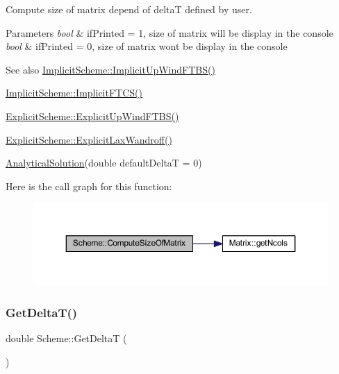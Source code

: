 Compute size of matrix depend of deltaT defined by user. 
\begin{DoxyParams}{Parameters}
{\em bool} & if\+Printed = 1, size of matrix will be display in the console \\
\hline
{\em bool} & if\+Printed = 0, size of matrix won\textquotesingle{}t be display in the console \\
\hline
\end{DoxyParams}
\begin{DoxySeeAlso}{See also}
\mbox{\hyperlink{class_implicit_scheme_ab8311a005d69690622e0ddaa0dcff94d}{Implicit\+Scheme\+::\+Implicit\+Up\+Wind\+F\+T\+B\+S()}} 

\mbox{\hyperlink{class_implicit_scheme_afd2b8e73e914a04c326b8cba0d5810ce}{Implicit\+Scheme\+::\+Implicit\+F\+T\+C\+S()}} 

\mbox{\hyperlink{class_explicit_scheme_a52c0d19315a6014f43a9d007c70582d6}{Explicit\+Scheme\+::\+Explicit\+Up\+Wind\+F\+T\+B\+S()}} 

\mbox{\hyperlink{class_explicit_scheme_a2698e08e62763c56b972b478d665c34c}{Explicit\+Scheme\+::\+Explicit\+Lax\+Wandroff()}} 

\mbox{\hyperlink{class_scheme_a7d3e9f8133a955517471eb7a6fea355f}{Analytical\+Solution}}(double default\+DeltaT = 0) 
\end{DoxySeeAlso}
Here is the call graph for this function\+:
\nopagebreak
\begin{figure}[H]
\begin{center}
\leavevmode
\includegraphics[width=350pt]{class_scheme_a0364e328d78e84be15d293a66d946008_cgraph}
\end{center}
\end{figure}
\mbox{\label{class_scheme_af05aa7671d5c080c0cca501cb6717cd0}} 
\subsubsection{\texorpdfstring{Get\+Delta\+T()}{GetDeltaT()}}
{\footnotesize\ttfamily double Scheme\+::\+Get\+DeltaT (\begin{DoxyParamCaption}{ }\end{DoxyParamCaption})}

